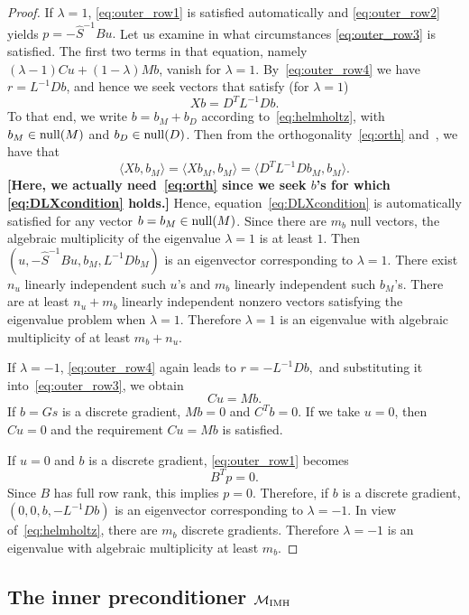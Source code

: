 \documentclass{siamltex}
\begin{document}
\begin{proof}
If $\lambda = 1$, \eqref{eq:outer_row1} is satisfied automatically and \eqref{eq:outer_row2} yields
$p = -\widehat{S}^{-1} B u.$
Let us examine in what circumstances \eqref{eq:outer_row3} is satisfied.
The first two terms in that equation, namely $(\lambda -1) C u + (1 - \lambda) M b$, vanish for $\lambda=1$.  By~\eqref{eq:outer_row4} we have $r = L^{-1} D b$, and hence we seek vectors that satisfy (for $\lambda=1$)
\begin{equation}
\label{eq:DLXcondition}
  X b = D^T L^{-1} D b .
  \end{equation}
To that end, we write $b=b_M+b_D$ according to~\eqref{eq:helmholtz}, with $b_M \in {\rm null}(M)$ and $b_D \in {\rm null}(D)$. Then from the orthogonality~\eqref{eq:orth} and~\cite[Corollary~3.2]{Greif07}, we have that
$$
\langle Xb ,b_M\rangle=\langle X b_M, b_M \rangle = \langle D^T L^{-1} D b_M, b_M \rangle.
$$
{\bf [Here, we actually need~\eqref{eq:orth} since we seek $b$'s for which \eqref{eq:DLXcondition} holds.]}
Hence, equation~\eqref{eq:DLXcondition} is automatically satisfied for any vector $b=b_M \in {\rm null}(M)$. Since there are $m_b$ null vectors, the algebraic multiplicity of the eigenvalue $\lambda=1$ is at least $1$. Then
$(u, -\widehat{S}^{-1} B u, b_M, L^{-1} D b_M)$ is an eigenvector corresponding to $\lambda=1$. There exist $n_u$ linearly independent such $u$'s and $m_b$ linearly independent such $b_M$'s. There are at least $n_u+m_b$ linearly independent nonzero vectors satisfying the eigenvalue problem when $\lambda = 1$. Therefore $\lambda = 1$ is an eigenvalue with algebraic multiplicity of at least $m_b + n_u$.

If $\lambda = -1$, \eqref{eq:outer_row4} again leads to $r = -L^{-1} D b, $ and
substituting it into~\eqref{eq:outer_row3}, we obtain $$Cu = Mb.$$ If $b=Gs$ is a discrete gradient, $Mb = 0$ and $C^T b = 0$. If we take $u=0$, then $Cu = 0$ and the requirement $Cu = Mb$ is satisfied.


If $u=0$ and $b$ is a discrete gradient, \eqref{eq:outer_row1} becomes $$B^Tp = 0.$$ Since $B$ has full row rank, this implies $p=0$.
Therefore, if $b$ is a discrete gradient, $(0, 0, b, -L^{-1}D b)$ is an eigenvector corresponding to $\lambda = -1$. In view of~\eqref{eq:helmholtz}, there are $m_b$ discrete gradients. Therefore $\lambda = -1$ is an eigenvalue with algebraic multiplicity at least  $m_b$.
\end{proof}


\subsection{The inner preconditioner $\mathcal{M}_{\rm  IMH}$}
\end{document}
